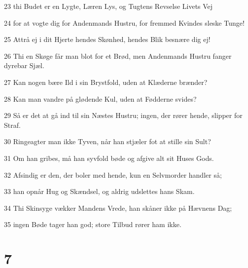 \par 23 thi Budet er en Lygte, Læren Lys, og Tugtens Revselse Livets Vej
\par 24 for at vogte dig for Andenmands Hustru, for fremmed Kvindes sleske Tunge!
\par 25 Attrå ej i dit Hjerte hendes Skønhed, hendes Blik besnære dig ej!
\par 26 Thi en Skøge får man blot for et Brød, men Andenmands Hustru fanger dyrebar Sjæl.
\par 27 Kan nogen bære Ild i sin Brystfold, uden at Klæderne brænder?
\par 28 Kan man vandre på glødende Kul, uden at Fødderne svides?
\par 29 Så er det at gå ind til sin Næstes Hustru; ingen, der rører hende, slipper for Straf.
\par 30 Ringeagter man ikke Tyven, når han stjæler fot at stille sin Sult?
\par 31 Om han gribes, må han syvfold bøde og afgive alt sit Huses Gods.
\par 32 Afsindig er den, der boler med hende, kun en Selvmorder handler så;
\par 33 han opnår Hug og Skændsel, og aldrig udslettes hans Skam.
\par 34 Thi Skinsyge vækker Mandens Vrede, han skåner ikke på Hævnens Dag;
\par 35 ingen Bøde tager han god; store Tilbud rører ham ikke.

\chapter{7}


